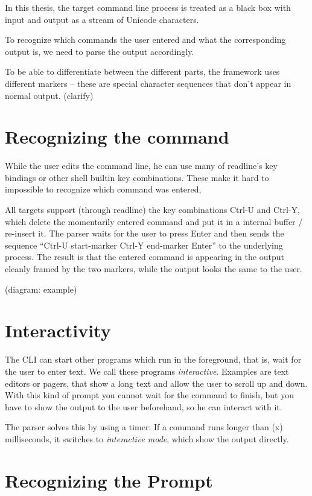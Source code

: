 \documentclass[twoside]{scrreprt}
\begin{document}
In this thesis, the target command line process is treated as a black box with input and output as a stream of Unicode characters.

To recognize which commands the user entered and what the corresponding output is, we need to parse the output accordingly.

To be able to differentiate between the different parts, the framework uses different markers -- these are special character sequences that don't appear in normal output. (clarify)

\section{Recognizing the command}

While the user edits the command line, he can use many of readline's key bindings or other shell builtin key combinations. These make it hard to impossible to recognize which command was entered, 

All targets support (through readline) the key combinations Ctrl-U and Ctrl-Y, which delete the momentarily entered command and put it in a internal buffer / re-insert it. The parser waits for the user to press Enter and then sends the sequence “Ctrl-U start-marker Ctrl-Y end-marker Enter” to the underlying process. The result is that the entered command is appearing in the output cleanly framed by the two markers, while the output looks the same to the user.

(diagram: example)

\section{Interactivity}

The CLI can start other programs which run in the foreground, that is, wait for the user to enter text. We call these programs \emph{interactive}. Examples are text editors or pagers, that show a long text and allow the user to scroll up and down. With this kind of prompt you cannot wait for the command to finish, but you have to show the output to the user beforehand, so he can interact with it.

The parser solves this by using a timer: If a command runs longer than (x) milliseconds, it switches to \emph{interactive mode}, which show the output directly.

\section{Recognizing the Prompt}
\end{document}
